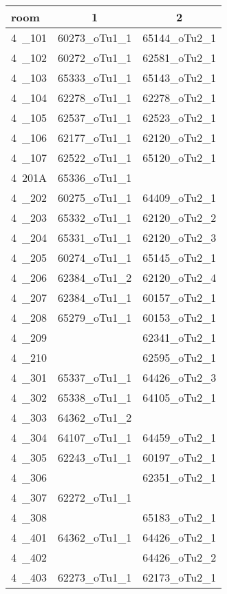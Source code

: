 \begin{table}[htbp]
 \begin{center}
  {\footnotesize
  \begin{tabular}{lcc}
   \hline
   room & 1 & 2 \\
   \hline
   4~\_101 & 60273\_oTu1\_1 & 65144\_oTu2\_1 \\
   4~\_102 & 60272\_oTu1\_1 & 62581\_oTu2\_1 \\
   4~\_103 & 65333\_oTu1\_1 & 65143\_oTu2\_1 \\
   4~\_104 & 62278\_oTu1\_1 & 62278\_oTu2\_1 \\
   4~\_105 & 62537\_oTu1\_1 & 62523\_oTu2\_1 \\
   4~\_106 & 62177\_oTu1\_1 & 62120\_oTu2\_1 \\
   4~\_107 & 62522\_oTu1\_1 & 65120\_oTu2\_1 \\
   4~201A & 65336\_oTu1\_1 &   \\
   4~\_202 & 60275\_oTu1\_1 & 64409\_oTu2\_1 \\
   4~\_203 & 65332\_oTu1\_1 & 62120\_oTu2\_2 \\
   4~\_204 & 65331\_oTu1\_1 & 62120\_oTu2\_3 \\
   4~\_205 & 60274\_oTu1\_1 & 65145\_oTu2\_1 \\
   4~\_206 & 62384\_oTu1\_2 & 62120\_oTu2\_4 \\
   4~\_207 & 62384\_oTu1\_1 & 60157\_oTu2\_1 \\
   4~\_208 & 65279\_oTu1\_1 & 60153\_oTu2\_1 \\
   4~\_209 &   & 62341\_oTu2\_1 \\
   4~\_210 &   & 62595\_oTu2\_1 \\
   4~\_301 & 65337\_oTu1\_1 & 64426\_oTu2\_3 \\
   4~\_302 & 65338\_oTu1\_1 & 64105\_oTu2\_1 \\
   4~\_303 & 64362\_oTu1\_2 &   \\
   4~\_304 & 64107\_oTu1\_1 & 64459\_oTu2\_1 \\
   4~\_305 & 62243\_oTu1\_1 & 60197\_oTu2\_1 \\
   4~\_306 &   & 62351\_oTu2\_1 \\
   4~\_307 & 62272\_oTu1\_1 &   \\
   4~\_308 &   & 65183\_oTu2\_1 \\
   4~\_401 & 64362\_oTu1\_1 & 64426\_oTu2\_1 \\
   4~\_402 &   & 64426\_oTu2\_2 \\
   4~\_403 & 62273\_oTu1\_1 & 62173\_oTu2\_1 \\

\end{tabular}}
\end{center}
\end{table}
